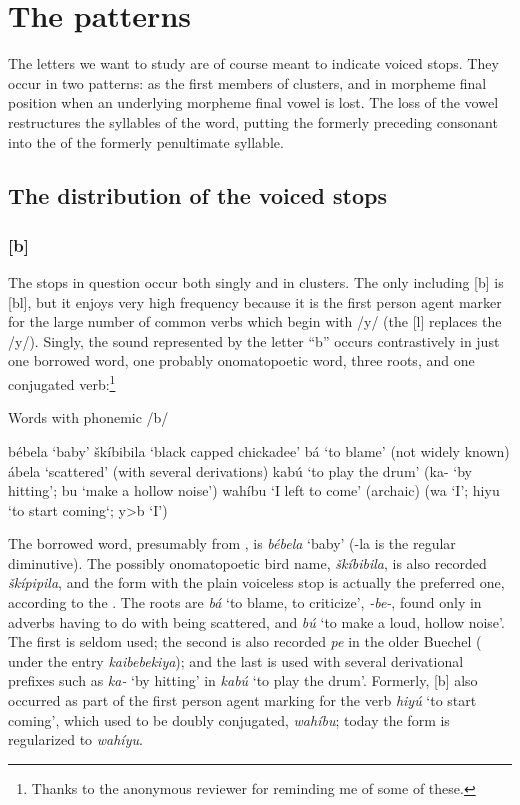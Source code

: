 \documentclass[output=paper]{LSP/langsci}
\begin{document}
\section{The patterns}

The letters we want to study are of course meant to indicate voiced stops. They occur in two patterns: as the first members of clusters, and in morpheme final position when an underlying morpheme final vowel is lost. The loss of the vowel restructures the syllables of the word, putting the formerly preceding consonant into the  of the formerly penultimate syllable.

\subsection{The distribution of the voiced stops}

\subsubsection{[b]}

The stops in question occur both singly and in clusters. The only  including [b] is [bl], but it enjoys very high frequency because it is the first person agent marker for the large number of common verbs which begin with /y/ (the [l] replaces the /y/). Singly, the sound represented by the letter ``b'' occurs contrastively in just one borrowed word, one probably onomatopoetic word, three roots, and one conjugated verb:\footnote{Thanks to the anonymous reviewer for reminding me of some of these.}

\begin{exe} \label{ex:rood:1}
\ex Words with phonemic /b/
\begin{xlist}
\ex b\'ebela `baby'
\ex \v{s}k\'ibibila `black capped chickadee'
\ex b\'a `to blame' (not widely known)
\ex \'abela `scattered' (with several derivations)
\ex kab\'u `to play the drum' (ka- `by hitting'; bu `make a hollow noise')
\ex wah\'ibu `I left to come' (archaic) (wa `I'; hiyu `to start coming`; y>b `I')
\end{xlist}
\end{exe}

The borrowed word, presumably from , is \textit{b\'ebela} `baby' (-la is the regular  diminutive). The possibly onomatopoetic bird name, \textit{\v{s}k\'ibibila}, is also recorded \textit{\v{s}k\'ipipila}, and the form with the plain voiceless stop is actually the preferred one, according to the . The roots are \textit{b\'a} `to blame, to criticize', \textit{-be-}, found only in adverbs having to do with being scattered, and \textit{b\'u} `to make a loud, hollow noise'. The first is seldom used; the second is also recorded \textit{pe} in the older Buechel  (\citealt[278]{Buechel1970} under the entry \textit{kaibebekiya}); and the last is used with several derivational prefixes such as \textit{ka-} `by hitting' in \textit{kab\'u} `to play the drum'. Formerly, [b] also occurred as part of the first person agent marking for the verb \textit{hiy\'u} `to start coming', which used to be doubly conjugated, \textit{wah\'ibu}; today the form is regularized to \textit{wah\'iyu}.
\end{document}
